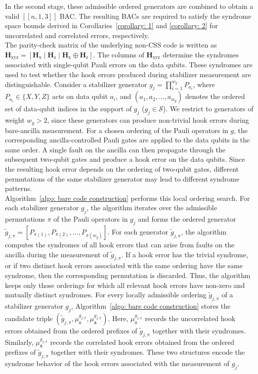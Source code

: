 \documentclass[reprint, amsmath,amssymb, aps,pra,
 floatfix,
]{revtex4-2}
\begin{document}
In the second stage, these admissible ordered generators are combined to obtain a valid \([[n,1,3]]\) BAC.
The resulting BACs are required to satisfy the syndrome space bounds derived in Corollaries~\ref{corollary: 1} and \ref{corollary: 2} for uncorrelated and correlated errors, respectively.\\
\noindent The parity-check matrix of the underlying non-CSS code is written as $\mathbf{H}_{\mathrm{xyz}} = [\mathbf{H}_\mathrm{x}
\mid \mathbf{H}_\mathrm{z} \mid \mathbf{H}_\mathrm{x}\oplus\mathbf{H}_\mathrm{z}].$
The columns of $\mathbf{H}_{\mathrm{xyz}}$ determine the syndromes associated with single-qubit Pauli errors on the data qubits.
These syndromes are used to test whether the hook errors produced during stabilizer measurement are distinguishable.
\noindent Consider a stabilizer generator $g_j=\prod_{i=1}^{w_g}P_{a_i}$, where $P_{a_i}\in\{X,Y,Z\}$ acts on data qubit $a_i$, and
$(a_1,a_2,\ldots, a_{w_g})$ denotes the ordered set of data-qubit indices in the support of $g_j$ ($g_j \in \mathcal{S} $).
We restrict to generators of weight $w_g>2$, since these generators can produce non-trivial hook errors during bare-ancilla measurement.
For a chosen ordering of the Pauli operators in $g$, the corresponding ancilla-controlled Pauli gates are applied to the data qubits in the same order.
A single fault on the ancilla can then propagate through the subsequent two-qubit gates and produce a hook error on the data qubits.
Since the resulting hook error depends on the ordering of two-qubit gates, different permutations of the same stabilizer generator may lead to different syndrome patterns.\\
\noindent Algorithm~\ref{algo: bare code construction} performs this local ordering search. For each stabilizer generator $g_{j}$, the algorithm iterates over the admissible permutations $\pi$ of the Pauli operators in $g_j$ and forms the ordered generator $ \tilde g_{j,\pi}=[P_{\pi(1)},P_{\pi(2)},\ldots,P_{\pi(w_g)}]$.
For each generator $\tilde g_{j,\pi}$, the algorithm computes the syndromes of all hook errors that can arise from faults on the ancilla during the measurement of $\tilde g_{j,\pi}$.
If a hook error has the trivial syndrome, or if two distinct hook errors associated with the same ordering have the same syndrome, then the corresponding permutation is discarded.
Thus, the algorithm keeps only those orderings for which all relevant hook errors have non-zero and mutually distinct syndromes.
For every locally admissible ordering $\tilde g_{j,\pi}$ of a stabilizer generator $g_{j}$, Algorithm~\ref{algo: bare code construction} stores the candidate triple $
    \left(
    \tilde g_{j,\pi},
    \mu^{g_{j,\pi}}_\mathtt{o},
    \mu^{g_{j,\pi}}_\mathtt{a}
    \right).$
Here, $\mu^{g_{j,\pi}}_\mathtt{o}$ records the uncorrelated hook errors obtained from the ordered prefixes of $\tilde g_{j, \pi}$ together with their syndromes. 
Similarly, $\mu^{g_{j,\pi}}_\mathtt{a}$ records the correlated hook errors obtained from the ordered prefixes of $\tilde g_{j, \pi}$ together with their syndromes. 
These two structures encode the syndrome behavior of the hook errors associated with the measurement of $g_j$.
\end{document}

